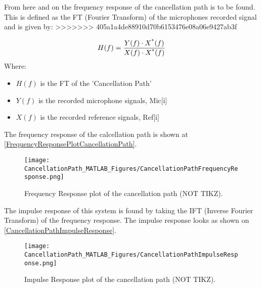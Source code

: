 %	


From here and on the frequency response of the cancellation path is to be found. This is defined as the FT (Fourier Transform) of the microphones recorded signal and is given by:
>>>>>>> 405a1a4de88910d70b6153476e08a06e9427ab3f

\begin{equation}
\label{FrequencyResponseEq}
H(f) = \frac{Y(f) \cdot X\textsuperscript{*}(f)}{X(f) \cdot X\textsuperscript{*}(f)}
\end{equation}
Where:
\begin{itemize}
	\item $H(f)$ is the FT of the 'Cancellation Path'
	\item $Y(f)$ is the recorded microphone signals, Mic[i]
	\item $X(f)$ is the recorded reference signals, Ref[i]
\end{itemize}

The frequency response of the calcellation path is shown at \autoref{FrequencyResponsePlotCancellationPath}.

\begin{figure}[H]
	\centering
	\texttt{[image: CancellationPath\_MATLAB\_Figures/CancellationPathFrequencyResponse.png]}
	\caption{Frequency Response plot of the cancellation path (NOT TIKZ).}
	\label{FrequencyResponsePlotCancellationPath}
\end{figure}

The impulse response of this system is found by taking the IFT (Inverse Fourier Transform) of the frequency response.
The impulse response looks as shown on \autoref{CancellationPathImpulseResponse}.

\begin{figure}[H]
	\centering
	\texttt{[image: CancellationPath\_MATLAB\_Figures/CancellationPathImpulseResponse.png]}
	\caption{Impulse Response plot of the cancellation path (NOT TIKZ).}
	\label{CancellationPathImpulseResponse}
\end{figure}

